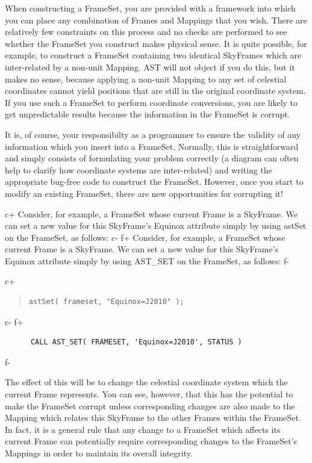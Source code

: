 \documentclass[twoside,11pt]{article}
\begin{document}
When constructing a FrameSet, you are provided with a framework into
which you can place any combination of Frames and Mappings that you
wish. There are relatively few constraints on this process and no
checks are performed to see whether the FrameSet you construct makes
physical sense.  It is quite possible, for example, to construct a
FrameSet containing two identical SkyFrames which are inter-related by
a non-unit Mapping. AST will not object if you do this, but it makes
no sense, because applying a non-unit Mapping to any set of celestial
coordinates cannot yield positions that are still in the original
coordinate system.  If you use such a FrameSet to perform coordinate
conversions, you are likely to get unpredictable results because the
information in the FrameSet is corrupt.

It is, of course, your responsibilty as a programmer to ensure the
validity of any information which you insert into a
FrameSet. Normally, this is straightforward and simply consists of
formulating your problem correctly (a diagram can often help to
clarify how coordinate systems are inter-related) and writing the
appropriate bug-free code to construct the FrameSet. However, once you
start to modify an existing FrameSet, there are new opportunities for
corrupting it!

c+
Consider, for example, a FrameSet whose current Frame is a
SkyFrame. We can set a new value for this SkyFrame's Equinox attribute
simply by using astSet on the FrameSet, as follows:
c-
f+
Consider, for example, a FrameSet whose current Frame is a
SkyFrame. We can set a new value for this SkyFrame's Equinox attribute
simply by using AST\_SET on the FrameSet, as follows:
f-

c+
\begin{quote}
\small
\begin{verbatim}
astSet( frameset, "Equinox=J2010" );
\end{verbatim}
\normalsize
\end{quote}
c-
f+
\small
\begin{verbatim}
      CALL AST_SET( FRAMESET, 'Equinox=J2010', STATUS )
\end{verbatim}
\normalsize
f-

The effect of this will be to change the celestial coordinate system
which the current Frame represents. You can see, however, that this
has the potential to make the FrameSet corrupt unless corresponding
changes are also made to the Mapping which relates this SkyFrame to
the other Frames within the FrameSet. In fact, it is a general rule
that any change to a FrameSet which affects its current Frame can
potentially require corresponding changes to the FrameSet's Mappings
in order to maintain its overall integrity.
\end{document}
